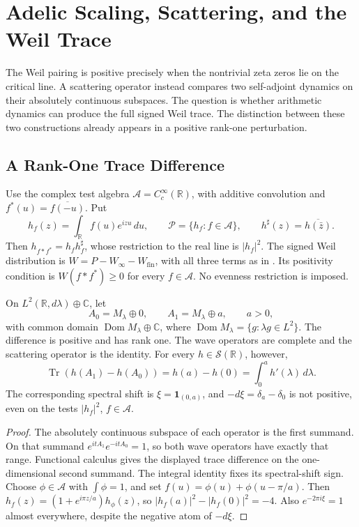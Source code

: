 \chapter{Adelic Scaling, Scattering, and the Weil Trace}
\label{v4-arith:w7-j:ATP-adelic-scattering}

The Weil pairing is positive precisely when the nontrivial zeta zeros
lie on the critical line. A scattering operator instead compares two
self-adjoint dynamics on their absolutely continuous subspaces.
The question is whether arithmetic dynamics can produce the full signed
Weil trace. The distinction between these two constructions already
appears in a positive rank-one perturbation.

\section{A Rank-One Trace Difference}
\label{v4-arith:w7-j:domain}

Use the complex test algebra
\(\mathscr A=C_c^\infty(\mathbb R)\), with additive convolution and
\(f^*(u)=\overline{f(-u)}\). Put
\[
 h_f(z)=\int_{\mathbb R}f(u)e^{izu}\,du,\qquad
 \mathscr P=\{h_f:f\in\mathscr A\},\qquad
 h^\sharp(z)=\overline{h(\bar z)}.
\]
Then \(h_{f*f^*}=h_fh_f^\sharp\), whose restriction to the real
line is \(|h_f|^2\). The signed Weil distribution is
\(W=P-W_\infty-W_{\mathrm{fin}}\), with all three terms as in
.
Its positivity condition is \(W(f*f^*)\geq0\) for every
\(f\in\mathscr A\). No evenness restriction is imposed.

\begin{proposition}
\label{v4-arith:w7-j:prop:rank-one-sign}
On \(L^2(\mathbb R,d\lambda)\oplus\mathbb C\), let
\[
 A_0=M_\lambda\oplus0,\qquad A_1=M_\lambda\oplus a,
 \qquad a>0,
\]
with common domain \(\operatorname{Dom}M_\lambda\oplus\mathbb C\),
where \(\operatorname{Dom}M_\lambda=\{g:\lambda g\in L^2\}\).
The difference is positive and has rank one. The wave operators are
complete and the scattering operator is the identity. For every
\(h\in\mathscr S(\mathbb R)\), however,
\[
 \operatorname{Tr}(h(A_1)-h(A_0))=h(a)-h(0)
 =\int_0^a h'(\lambda)\,d\lambda.
\]
The corresponding spectral shift is
\(\xi=\mathbf1_{(0,a)}\), and \(-d\xi=\delta_a-\delta_0\)
is not positive, even on the tests \(|h_f|^2\), \(f\in\mathscr A\).
\end{proposition}
\begin{proof}
The absolutely continuous subspace of each operator is the first
summand. On that summand
\(e^{itA_1}e^{-itA_0}=1\), so both wave operators have exactly
that range. Functional calculus gives the displayed trace difference
on the one-dimensional second summand. The integral identity fixes
its spectral-shift sign.
Choose \(\phi\in\mathscr A\) with \(\int\phi=1\), and set
\(f(u)=\phi(u)+\phi(u-\pi/a)\).
Then \(h_f(z)=(1+e^{i\pi z/a})h_\phi(z)\), so
\(|h_f(a)|^2-|h_f(0)|^2=-4\).
Also \(e^{-2\pi i\xi}=1\) almost everywhere, despite the negative
atom of \(-d\xi\).
\end{proof}

